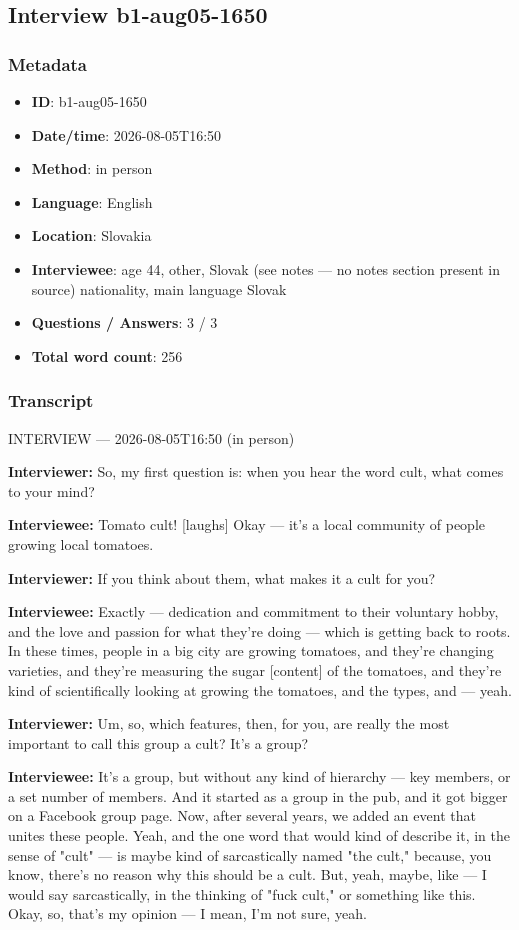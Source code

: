 \subsection{Interview b1-aug05-1650}\label{int:b1-aug05-1650}
\subsubsection*{Metadata}
\begin{itemize}
  \item \textbf{ID}: b1-aug05-1650
  \item \textbf{Date/time}: 2026-08-05T16:50
  \item \textbf{Method}: in person
  \item \textbf{Language}: English
  \item \textbf{Location}: Slovakia
  \item \textbf{Interviewee}: age 44, other, Slovak (see notes — no notes section present in source) nationality, main language Slovak
  \item \textbf{Questions / Answers}: 3 / 3
  \item \textbf{Total word count}: 256
\end{itemize}
\subsubsection*{Transcript}
INTERVIEW — 2026-08-05T16:50 (in person)

\textbf{Interviewer:} So, my first question is: when you hear the word cult, what comes to your mind?

\textbf{Interviewee:} Tomato cult! [laughs] Okay — it's a local community of people growing local tomatoes.

\textbf{Interviewer:} If you think about them, what makes it a cult for you?

\textbf{Interviewee:} Exactly — dedication and commitment to their voluntary hobby, and the love and passion for what they're doing — which is getting back to roots. In these times, people in a big city are growing tomatoes, and they're changing varieties, and they're measuring the sugar [content] of the tomatoes, and they're kind of scientifically looking at growing the tomatoes, and the types, and — yeah.

\textbf{Interviewer:} Um, so, which features, then, for you, are really the most important to call this group a cult? It's a group?

\textbf{Interviewee:} It's a group, but without any kind of hierarchy — key members, or a set number of members. And it started as a group in the pub, and it got bigger on a Facebook group page. Now, after several years, we added an event that unites these people. Yeah, and the one word that would kind of describe it, in the sense of "cult" — is maybe kind of sarcastically named "the cult," because, you know, there's no reason why this should be a cult. But, yeah, maybe, like — I would say sarcastically, in the thinking of "fuck cult," or something like this. Okay, so, that's my opinion — I mean, I'm not sure, yeah.

